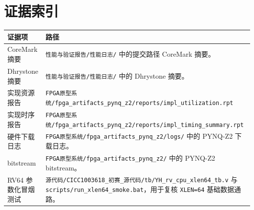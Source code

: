\documentclass[UTF8,a4paper,12pt,fontset=windows]{ctexart}
\newcommand{\Code}[1]{\texttt{#1}}
\begin{document}
\clearpage
\section*{证据索引}

\begin{tabularx}{\textwidth}{L{4.3cm}Y}
\toprule
{}
证据项 & 路径 \\
\midrule
CoreMark 摘要 & \Code{性能与验证报告/性能日志/} 中的提交路径 CoreMark 摘要。 \\
Dhrystone 摘要 & \Code{性能与验证报告/性能日志/} 中的 Dhrystone 摘要。 \\
实现资源报告 & \Code{FPGA原型系统/fpga\_artifacts\_pynq\_z2/reports/impl\_utilization.rpt} \\
实现时序报告 & \Code{FPGA原型系统/fpga\_artifacts\_pynq\_z2/reports/impl\_timing\_summary.rpt} \\
硬件下载日志 & \Code{FPGA原型系统/fpga\_artifacts\_pynq\_z2/logs/} 中的 PYNQ-Z2 下载日志。 \\
bitstream & \Code{FPGA原型系统/fpga\_artifacts\_pynq\_z2/} 中的 PYNQ-Z2 bitstream。 \\
RV64 参数化冒烟测试 & \Code{源代码/CICC1003618\_初赛\_源代码/tb/YH\_rv\_cpu\_xlen64\_tb.v} 与 \Code{scripts/run\_xlen64\_smoke.bat}，用于复核 \Code{XLEN=64} 基础数据通路。 \\
\bottomrule
\end{tabularx}
\end{document}
